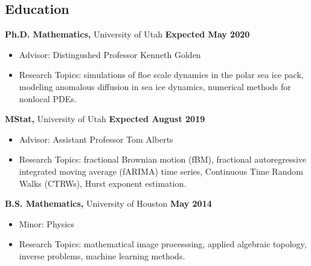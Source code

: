 \documentclass[margin,line]{res}
\begin{document}
\newcommand{\myname}{Huy Dinh}
\newlength{\mynamewidth}
\settowidth{\mynamewidth}{\namefont\myname}

\name{\hspace*{0.5\textwidth}\hspace{-0.5\mynamewidth} \myname \vspace*{.2in}}

\thispagestyle{empty}

\begin{resume}



\section{\sc Education}
{\bf Ph.D. Mathematics,} University of Utah \hfill {\bf Expected May 2020}\\
\vspace*{-.1in}
\begin{itemize} \setlength\itemsep{0em}
\item[ ] Advisor: Distingushed Professor Kenneth Golden
\item[ ] Research Topics: simulations of floe scale dynamics in the polar sea ice pack, modeling anomalous diffusion in sea ice dynamics, numerical methods for nonlocal PDEs.
\end{itemize}

{\bf MStat,} University of Utah \hfill {\bf Expected August 2019}\\
\vspace*{-.1in}
\begin{itemize} \setlength\itemsep{0em}
\item[ ] Advisor: Assistant Professor Tom Alberts
\item[ ] Research Topics: fractional Brownian motion (fBM), fractional autoregressive integrated moving average (fARIMA) time series, Continuous Time Random Walks (CTRWs), Hurst exponent estimation.
\end{itemize}

{\bf B.S. Mathematics,} University of Houston \hfill {\bf May 2014}\\
\vspace*{-.1in}
\begin{itemize} \setlength\itemsep{0em}
\item[ ] Minor: Physics
\item[ ] Research Topics: mathematical image processsing, applied algebraic topology, inverse problems, machine learning methods.
\end{itemize}


\end{resume}
\end{document}
